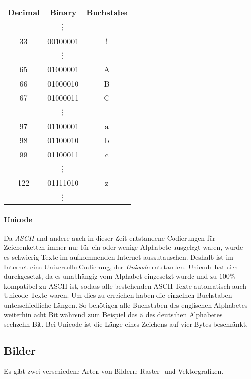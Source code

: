 \documentclass[../main.tex]{subfiles}
\begin{document}
                \begin{center}
                \begin{tabular}{ccc}
                    Decimal & Binary & Buchstabe \\\hline
                       & \vdots & \\
                    33 & 00100001 & ! \\
                       & \vdots & \\
                    65 & 01000001 & A \\
                    66 & 01000010 & B \\
                    67 & 01000011 & C \\
                       & \vdots & \\
                    97 & 01100001 & a \\
                    98 & 01100010 & b \\
                    99 & 01100011 & c \\
                       & \vdots & \\
                    122 & 01111010 & z \\
                       & \vdots & \\
                \end{tabular}
                \end{center}
            
            \paragraph{Unicode}
                Da \emph{ASCII} und andere auch in dieser Zeit entstandene Codierungen für Zeichenketten immer nur für ein oder wenige Alphabete ausgelegt waren, wurde es schwierig Texte im aufkommenden Internet auszutauschen. Deshalb ist im Internet eine Universelle Codierung, der \emph{Unicode} entstanden. Unicode hat sich durchgesetzt, da es unabhängig vom Alphabet eingesetzt wurde und zu $100\%$  kompatibel zu ASCII ist, sodass alle bestehenden ASCII Texte automatisch auch Unicode Texte waren. Um dies zu erreichen haben die einzelnen Buchstaben unterschiedliche Längen. So benötigen alle Buchstaben des englischen Alphabetes weiterhin acht Bit während zum Beispiel das ä des deutschen Alphabetes sechzehn Bit. Bei Unicode ist die Länge eines Zeichens auf vier Bytes beschränkt.
            
        \subsection{Bilder}
            Es gibt zwei verschiedene Arten von Bildern: Raster- und Vektorgrafiken.
            
\end{document}
